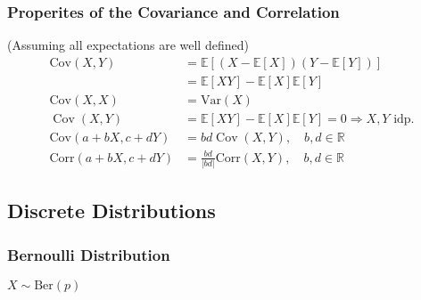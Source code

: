 \subsubsection{Properites of the Covariance and Correlation}
(Assuming all expectations are well defined)
\noindent\begin{align*}
    \mathrm{Cov}(X,Y)        & =\mathbb{E}[(X-\mathbb{E}[X])(Y-\mathbb{E}[Y])]                          \\
                             & = \mathbb{E}[XY]-\mathbb{E}[X]\mathbb{E}[Y]                              \\
    \mathrm{Cov}(X,X)        & = \mathrm{Var}(X)                                                        \\
    \operatorname{Cov}(X,Y)  & =\mathbb{E}[XY]-\mathbb{E}[X]\mathbb{E}[Y]=0 \Rightarrow X,Y\text{ idp.} \\
    \mathrm{Cov}(a+bX,c+dY)  & =bd\operatorname{Cov}(X,Y),\quad b,d\in\mathbb{R}                        \\
    \mathrm{Corr}(a+bX,c+dY) & ={\frac{bd}{|bd|}}\mathrm{Corr}(X,Y),\quad b,d\in\mathbb{R}
\end{align*}

\subsection{Discrete Distributions}

\subsubsection{Bernoulli Distribution}
$X \sim \mathrm{Ber}(p)$

\renewcommand{\arraystretch}{1.3}
\setlength{\oldtabcolsep}{\tabcolsep}\setlength\tabcolsep{3pt}

